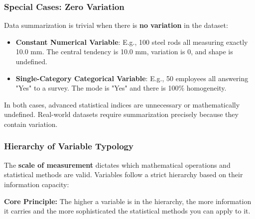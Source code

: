\subsubsection{Special Cases: Zero Variation}

Data summarization is trivial when there is \textbf{no variation} in the dataset:

\begin{itemize}
    \item \textbf{Constant Numerical Variable}: E.g., 100 steel rods all measuring exactly 10.0 mm. The central tendency is 10.0 mm, variation is $0$, and shape is undefined.
    \item \textbf{Single-Category Categorical Variable}: E.g., 50 employees all answering "Yes" to a survey. The mode is "Yes" and there is 100\% homogeneity.
\end{itemize}

In both cases, advanced statistical indices are unnecessary or mathematically undefined. Real-world datasets require summarization precisely because they contain variation.

\subsubsection{Hierarchy of Variable Typology}

The \textbf{scale of measurement} dictates which mathematical operations and statistical methods are valid. Variables follow a strict hierarchy based on their information capacity:

\vspace{0.2cm}
\begin{center}
\end{center}
\vspace{0.2cm}

\textbf{Core Principle:} The higher a variable is in the hierarchy, the more information it carries and the more sophisticated the statistical methods you can apply to it.

